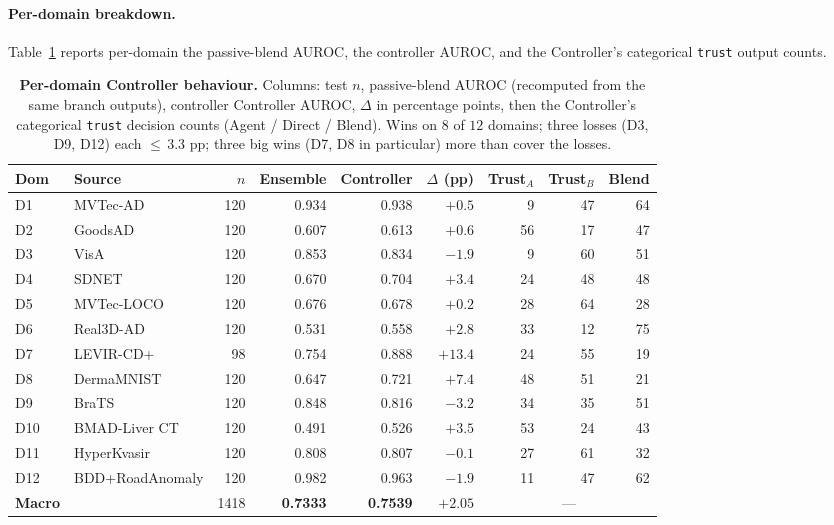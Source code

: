 \paragraph{Per-domain breakdown.}
Table~\ref{tab:controller_per_domain} reports per-domain
the passive-blend AUROC, the controller AUROC, and the Controller's categorical
\texttt{trust} output counts.

\begin{table}[t]
\centering
\footnotesize
\caption{\textbf{Per-domain Controller behaviour.} Columns: test $n$,
passive-blend AUROC (recomputed from the same branch outputs), controller
Controller AUROC, $\Delta$ in percentage points, then the Controller's
categorical \texttt{trust} decision counts (Agent / Direct / Blend).
Wins on $8$ of $12$ domains; three losses (D3, D9, D12) each $\le\,3.3$ pp;
three big wins (D7, D8 in particular) more than cover the losses.}
\label{tab:controller_per_domain}
\begin{tabular}{llrrrrrrr}
\toprule
Dom & Source & $n$ & Ensemble & Controller & $\Delta$ (pp) & Trust$_A$ & Trust$_B$ & Blend\\
\midrule
D1 & MVTec-AD          & 120 & 0.934 & 0.938 & $+0.5$        &  9 & 47 & 64 \\
D2 & GoodsAD           & 120 & 0.607 & 0.613 & $+0.6$        & 56 & 17 & 47 \\
D3 & VisA              & 120 & 0.853 & 0.834 & $-1.9$        &  9 & 60 & 51 \\
D4 & SDNET             & 120 & 0.670 & 0.704 & $+3.4$        & 24 & 48 & 48 \\
D5 & MVTec-LOCO        & 120 & 0.676 & 0.678 & $+0.2$        & 28 & 64 & 28 \\
D6 & Real3D-AD         & 120 & 0.531 & 0.558 & $+2.8$        & 33 & 12 & 75 \\
D7 & LEVIR-CD+         &  98 & 0.754 & 0.888 & $\mathbf{+13.4}$ & 24 & 55 & 19 \\
D8 & DermaMNIST        & 120 & 0.647 & 0.721 & $\mathbf{+7.4}$  & 48 & 51 & 21 \\
D9 & BraTS             & 120 & 0.848 & 0.816 & $-3.2$        & 34 & 35 & 51 \\
D10 & BMAD-Liver CT    & 120 & 0.491 & 0.526 & $+3.5$        & 53 & 24 & 43 \\
D11 & HyperKvasir      & 120 & 0.808 & 0.807 & $-0.1$        & 27 & 61 & 32 \\
D12 & BDD+RoadAnomaly  & 120 & 0.982 & 0.963 & $-1.9$        & 11 & 47 & 62 \\
\midrule
\textbf{Macro} & & 1418 & \textbf{0.7333} & \textbf{0.7539} & $\mathbf{+2.05}$ & \multicolumn{3}{c}{---} \\
\bottomrule
\end{tabular}
\end{table}

